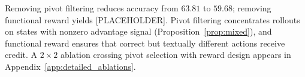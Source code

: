 Removing pivot filtering reduces accuracy from $63.81$ to $59.68$; removing functional reward yields [PLACEHOLDER]. Pivot filtering concentrates rollouts on states with nonzero advantage signal (Proposition~\ref{prop:mixed}), and functional reward ensures that correct but textually different actions receive credit. A $2\times 2$ ablation crossing pivot selection with reward design appears in Appendix~\ref{app:detailed_ablations}.
